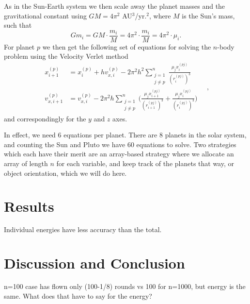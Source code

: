 \documentclass[]{article}
\begin{document}
As in the Sun-Earth system we then scale away the planet masses and the gravitational constant using $GM = 4 \pi^2$ AU$^3$/yr.$^2$, where $M$ is the Sun's mass, such that
\begin{equation}
	Gm_i = GM \cdot \frac{m_i}{M} = 4\pi^2 \cdot \frac{m_i}{M} = 4\pi^2 \cdot \mu_i.
\end{equation}
For planet $p$ we then get the following set of equations for solving the $n$-body problem using the Velocity Verlet method 
\begin{equation} \label{verlet-n}
\begin{aligned}
	x_{i+1}^{(p)} &= x_i^{(p)} + hv_{x,i}^{(p)} - 2\pi^2h^2 \sum_{\substack{j=1  \\ j \neq p}}^{n} \frac{\mu_j x_i^{(pj)}}{(r_i^{(pj)})^3} \\
	v_{x,i+1}^{(p)} &= v_{x,i}^{(p)} - 2\pi^2h \sum_{\substack{j=1  \\ j \neq p}}^{n} \bigg(\frac{\mu_j x_{i+1}^{(pj)}}{(r_{i+1}^{(pj)})^3} + \frac{\mu_j x_i^{(pj)}}{(r_i^{(pj)})^3} \bigg)	
\end{aligned} \quad ,
\end{equation}
and correspondingly for the $y$ and $z$ axes.

In effect, we need 6 equations per planet. There are 8 planets in the solar system, and counting the Sun and Pluto we have 60 equations to solve. Two strategies which each have their merit are an array-based strategy where we allocate an array of length $n$ for each variable, and keep track of the planets that way, or object orientation, which we will do here.




\section{Results} \label{results}


Individual energies have less accuracy than the total.

\section{Discussion and Conclusion} \label{conclusion}

n=100 case has flown only (100-1/8) rounds vs 100 for n=1000, but energy is the same. What does that have to say for the energy?


\clearpage


\end{document}
